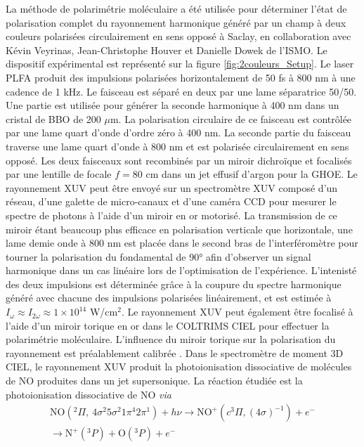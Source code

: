 La méthode de polarimétrie moléculaire a été utilisée pour déterminer l'état de polarisation complet du rayonnement harmonique généré par un champ à deux couleurs polarisées circulairement en sens opposé à Saclay, en collaboration avec Kévin Veyrinas, Jean-Christophe Houver et Danielle Dowek de l'ISMO. Le dispositif expérimental est représenté sur la figure \ref{fig:2couleurs_Setup}. Le laser PLFA  produit des impulsions polarisées horizontalement de 50 fs à 800 nm à une cadence de 1 kHz. Le faisceau est séparé en deux par une lame séparatrice 50/50. Une partie est utilisée pour générer la seconde harmonique à 400 nm dans un cristal de BBO de 200 $\mu$m. La polarisation circulaire de ce faisceau est contrôlée par une lame quart d'onde d'ordre zéro à 400 nm. La seconde partie du faisceau traverse une lame quart d'onde à 800 nm et est polarisée circulairement en sens opposé. Les deux faisceaux sont recombinés par un miroir dichroïque et focalisés par une lentille de focale $f = 80$ cm dans un jet effusif d'argon pour la GHOE. Le rayonnement XUV peut être envoyé sur un spectromètre XUV composé d'un réseau, d'une galette de micro-canaux et d'une caméra CCD pour mesurer le spectre de photons à l'aide d'un miroir en or motorisé. La transmission de ce miroir étant beaucoup plus efficace en polarisation verticale que horizontale, une lame demie onde à 800 nm est placée dans le second bras de l'interféromètre pour tourner la polarisation du fondamental de 90° afin d'observer un signal harmonique dans un cas linéaire lors de l'optimisation de l'expérience. L'intenisté des deux impulsions est déterminée grâce à la coupure du spectre harmonique généré avec chacune des impulsions polarisées linéairement, et est estimée à $I_\omega \approx I_{2\omega} \approx 1 \times 10^{14}$ W/cm$^2$. Le rayonnement XUV peut également être focalisé à l'aide d'un miroir torique en or dans le COLTRIMS CIEL  pour effectuer la polarimétrie moléculaire. L'influence du miroir torique sur la polarisation du rayonnement est préalablement calibrée . Dans le spectromètre de moment 3D CIEL, le rayonnement XUV produit la photoionisation dissociative de molécules de NO produites dans un jet supersonique. La réaction étudiée est la photoionisation dissociative de NO \textit{via}
\begin{multline}
\text{NO}(^2\Pi, \: 4\sigma^2 5\sigma^2 1\pi^4 2\pi^1) + h\nu \longrightarrow \text{NO}^+ (c ^3\Pi, (4\sigma)^{-1})  + e^- \\\longrightarrow \text{N}^+ (^3P) + \text{O} (^3P) + e^-
\label{eq:PID_NO}
\end{multline}
